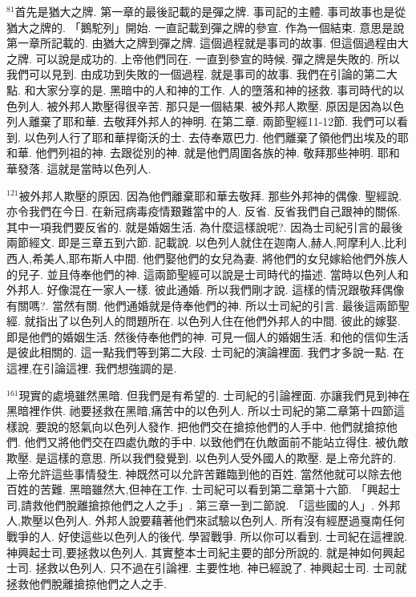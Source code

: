 \documentclass{book}
\begin{document}
$^{81}$首先是猶大之牌.
第一章的最後記載的是彈之牌.
事司記的主體.
事司故事也是從猶大之牌的.
「鵝駝列」開始.
一直記載到彈之牌的參宣.
作為一個結束.
意思是說第一章所記載的.
由猶大之牌到彈之牌.
這個過程就是事司的故事.
但這個過程由大之牌.
可以說是成功的.
上帝他們同在.
一直到參宣的時候.
彈之牌是失敗的.
所以我們可以見到.
由成功到失敗的一個過程.
就是事司的故事.
我們在引論的第二大點.
和大家分享的是.
黑暗中的人和神的工作.
人的墮落和神的拯救.
事司時代的以色列人.
被外邦人欺壓得很辛苦.
那只是一個結果.
被外邦人欺壓.
原因是因為以色列人離棄了耶和華.
去敬拜外邦人的神明.
在第二章.
兩節聖經11-12節.
我們可以看到.
以色列人行了耶和華捍衛沃的士.
去侍奉眾巴力.
他們離棄了領他們出埃及的耶和華.
他們列祖的神.
去跟從別的神.
就是他們周圍各族的神.
敬拜那些神明.
耶和華發落.
這就是當時以色列人.

$^{121}$被外邦人欺壓的原因.
因為他們離棄耶和華去敬拜.
那些外邦神的偶像.
聖經說.
亦令我們在今日.
在新冠病毒疫情艱難當中的人.
反省.
反省我們自己跟神的關係.
其中一項我們要反省的.
就是婚姻生活.
為什麼這樣說呢?.
因為士司紀引言的最後兩節經文.
即是三章五到六節.
記載說.
以色列人就住在迦南人,赫人,阿摩利人,比利西人,希美人,耶布斯人中間.
他們娶他們的女兒為妻.
將他們的女兒嫁給他們外族人的兒子.
並且侍奉他們的神.
這兩節聖經可以說是士司時代的描述.
當時以色列人和外邦人.
好像混在一家人一樣.
彼此通婚.
所以我們剛才說.
這樣的情況跟敬拜偶像有關嗎?.
當然有關.
他們通婚就是侍奉他們的神.
所以士司紀的引言.
最後這兩節聖經.
就指出了以色列人的問題所在.
以色列人住在他們外邦人的中間.
彼此的嫁娶.
即是他們的婚姻生活.
然後侍奉他們的神.
可見一個人的婚姻生活.
和他的信仰生活是彼此相關的.
這一點我們等到第二大段.
士司紀的演論裡面.
我們才多說一點.
在這裡,在引論這裡.
我們想強調的是.

$^{161}$現實的處境雖然黑暗.
但我們是有希望的.
士司紀的引論裡面.
亦讓我們見到神在黑暗裡作供.
祂要拯救在黑暗,痛苦中的以色列人.
所以士司紀的第二章第十四節這樣說.
要說的怒氣向以色列人發作.
把他們交在搶掠他們的人手中.
他們就搶掠他們.
他們又將他們交在四處仇敵的手中.
以致他們在仇敵面前不能站立得住.
被仇敵欺壓.
是這樣的意思.
所以我們發覺到.
以色列人受外國人的欺壓.
是上帝允許的.
上帝允許這些事情發生.
神既然可以允許苦難臨到他的百姓.
當然他就可以除去他百姓的苦難.
黑暗雖然大,但神在工作.
士司紀可以看到第二章第十六節.
「興起士司,請救他們脫離搶掠他們之人之手」.
第三章一到二節說.
「這些國的人」.
外邦人,欺壓以色列人.
外邦人說要藉著他們來試驗以色列人.
所有沒有經歷過戛南任何戰爭的人.
好使這些以色列人的後代.
學習戰爭.
所以你可以看到.
士司紀在這裡說.
神興起士司,要拯救以色列人.
其實整本士司紀主要的部分所說的.
就是神如何興起士司.
拯救以色列人.
只不過在引論裡.
主要性地.
神已經說了.
神興起士司.
士司就拯救他們脫離搶掠他們之人之手.
\end{document}
